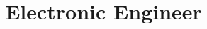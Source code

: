 \documentclass[10pt,a4paper,sans]{moderncv}
\title{Electronic Engineer}
\begin{document}
\makecvtitle









\pagebreak






\end{document}
